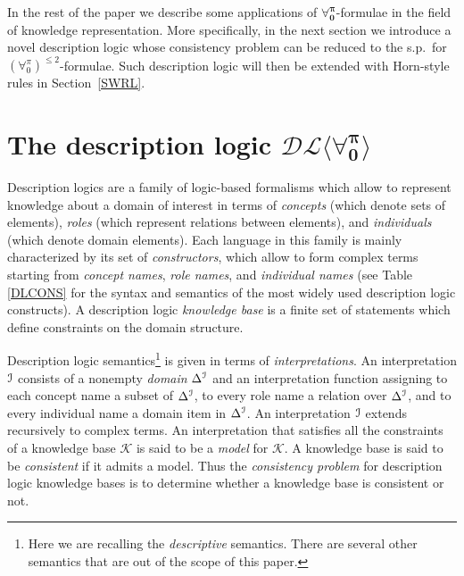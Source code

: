 \documentclass[a4paper,UKenglish]{lipics}
\newcommand{\Lang}{\ensuremath{\mathbf{\forall_{0}^{\pi}}}\xspace}
\newcommand{\LangBounded}[1]{\ensuremath{(\forall_{0}^{\pi})^{\leq #1}}\xspace}
\newcommand{\dlLang}{\ensuremath{\mathcal{DL\langle}\Lang\mathcal{\rangle}}\xspace}
\begin{document}
In the rest of the paper we describe some applications of
\Lang-formulae in the field of knowledge representation.  More
specifically, in the next section we introduce a novel description
logic whose consistency problem can be reduced to the s.p.\ for
$\LangBounded{2}$-formulae.  Such description logic will then be
extended with Horn-style rules in Section~\ref{SWRL}.


\section{The description logic \dlLang}\label{DL}

Description logics are a family of logic-based formalisms which allow
to represent knowledge about a domain of interest in terms of
\emph{concepts} (which denote sets of elements), \emph{roles} (which
represent relations between elements), and \emph{individuals} (which
denote domain elements).  Each language in this family is mainly
characterized by its set of \emph{constructors}, which allow to form
complex terms starting from \emph{concept names}, \emph{role names},
and \emph{individual names} (see Table \ref{DLCONS} for the syntax and
semantics of the most widely used description logic constructs).  A
description logic \emph{knowledge base} is a finite set of statements
which define constraints on the domain structure.

Description logic semantics\footnote{Here we are recalling the
\emph{descriptive} semantics.  There are several other semantics that
are out of the scope of this paper.} is given in terms of
\emph{interpretations}.  An interpretation $\mathcal{I}$ consists of a nonempty
\emph{domain} $\Delta^{\mathcal{I}}$ and an interpretation function assigning
to each concept name a subset of $\Delta^{\mathcal{I}}$, to every role name a
relation over $\Delta^{\mathcal{I}}$, and to every individual name a domain
item in $\Delta^{\mathcal{I}}$.  An interpretation $\mathcal{I}$ extends recursively to
complex terms.  An interpretation \I that satisfies all the
constraints of a knowledge base $\mathcal{K}$ is said to be a
\emph{model} for $\mathcal{K}$.  A knowledge base is said to be
\emph{consistent} if it admits a model.  Thus the \emph{consistency
problem} for description logic knowledge bases is to determine whether
a knowledge base is consistent or not.
\end{document}
